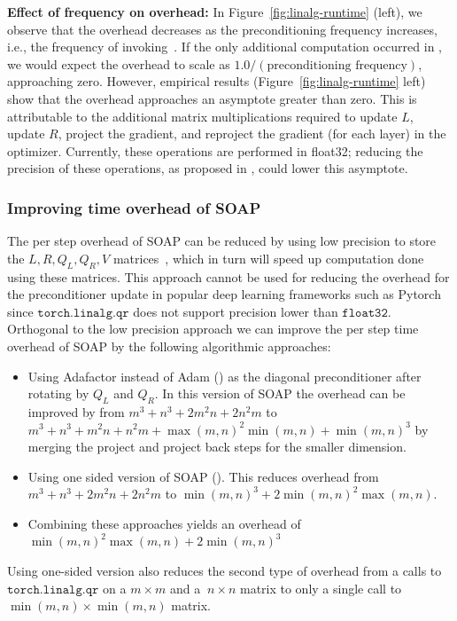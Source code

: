\documentclass{article}
\begin{document}
\textbf{Effect of frequency on  overhead:} In Figure~\ref{fig:linalg-runtime}
 (left), we observe that the overhead decreases as the preconditioning frequency increases, i.e., the frequency of invoking~. If the only additional computation occurred in , we would expect the overhead to scale as $1.0/(\text{preconditioning frequency})$, approaching zero. However, empirical results (Figure~\ref{fig:linalg-runtime} left) show that the overhead approaches an asymptote greater than zero. This is attributable to the additional matrix multiplications required to update $L$, update $R$, project the gradient, and reproject the gradient (for each layer) in the optimizer. Currently, these operations are performed in float32; reducing the precision of these operations, as proposed in \cite{4bitshampoo}, could lower this asymptote.

\subsubsection{Improving time overhead of SOAP}
\label{app:impr-time}
The per step overhead of SOAP can be reduced by using low precision to store the $L, R, Q_L, Q_R, V$ matrices~\citep{8bitadam,4bitshampoo}, which in turn will speed up computation done using these matrices. This approach cannot be used for reducing the overhead for the preconditioner update in popular deep learning frameworks such as Pytorch since $\texttt{torch.linalg.qr}$ does not support precision lower than $\texttt{float32}$. Orthogonal to the low precision approach we can improve the per step time overhead of SOAP by the following algorithmic approaches:
\begin{itemize}
    \item Using Adafactor instead of Adam () as the diagonal preconditioner after rotating by $Q_L$ and $Q_R$. In this version of SOAP the overhead can be improved by from $m^3+n^3+2m^2n+2n^2m$ to $m^3+n^3+m^2n+n^2m+\max(m, n)^2\min(m, n) + \min(m, n)^3$ by merging the project and project back steps for the smaller dimension.
    \item Using one sided version of SOAP (). This reduces overhead from $m^3+n^3+2m^2n+2n^2m$ to $\min(m, n)^3+2\min(m, n)^2\max(m, n)$. 
    \item Combining these approaches yields an overhead of $\min(m, n)^2\max(m, n)+2 \min(m, n)^3$
\end{itemize} 

Using one-sided version also reduces the second type of overhead from a calls to $\texttt{torch.linalg.qr}$ on a $m \times m$ and a $\ n \times n$ matrix to only a single call to $\min(m, n) \times \min(m, n)$ matrix.
\end{document}
